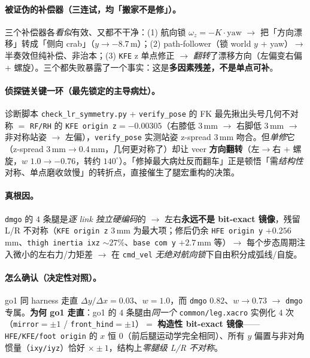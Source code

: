 \paragraph{被证伪的补偿器（三连试，均「搬家不是修」）。}
三个补偿器各\emph{看似}有效、又都不干净：(1) 航向锁 $\omega_z{=}-K\cdot\mathrm{yaw}$ $\to$ 把「方向漂移」转成「侧向 crab」（$y\to-8.7$\,m）；(2) path-follower（锁 world $y$ + yaw）$\to$ 半奏效但纯补偿、非治本；(3) \texttt{KFE} z 单点修正 $\to$ \emph{翻转}了漂移方向（左偏变右偏 + 螺旋）。三个都失败暴露了一个事实：这是\textbf{多因素残差，不是单点可补}。

\paragraph{侦探链关键一环（最先锁定的主导病灶）。}
诊断脚本 \texttt{check\_lr\_symmetry.\allowbreak py} + \texttt{verify\_pose} 的 FK 最先揪出头号几何不对称 $=$ \texttt{RF/RH} 的 \texttt{KFE origin z}$=-0.00305$（右膝低 $3$\,mm $\to$ 右脚低 $3$\,mm $\to$ 非对称站姿 $\to$ 左偏），\texttt{verify\_pose} 实测站姿 z-spread $3$\,mm 吻合。但\emph{单修}它（z-spread $3$\,mm$\to0.4$\,mm，几何更对称了）却让 veer \textbf{方向翻转}（左$\to$右 + 螺旋，$w$ $1.0\to-0.76$，转约 $140^\circ$）。「修掉最大病灶反而翻车」正是顿悟「需\emph{结构性}对称、单点磨收敛慢」的转折点，直接催生了腿宏重构的决策。

\paragraph{真根因。}
\texttt{dmgo} 的 $4$ 条腿是\emph{逐 link 独立硬编码}的 $\to$ 左右\textbf{永远不是 bit-exact 镜像}，残留 L/R 不对称（\texttt{KFE origin z} $3$\,mm 为最大项；修后仍余 \texttt{HFE origin y} $+0.256$\,mm、\texttt{thigh inertia ixz} $\sim27\%$、\texttt{base com y} $+2.7$\,mm 等）$\to$ 每个步态周期注入微小的左右力/力矩差 $\to$ 在 \texttt{cmd\_vel} \emph{无绝对航向锁}下自由积分成弧线/自旋。

\paragraph{怎么确认（决定性对照）。}
go1 同 harness 走直 $\Delta y/\Delta x{=}0.03$、$w{=}1.0$，而 \texttt{dmgo} $0.82$、$w\to0.73$ $\to$ \texttt{dmgo} 专属。\textbf{为何 go1 走直}：go1 的 $4$ 条腿由\emph{同一个} \texttt{common/\allowbreak leg.\allowbreak xacro} 实例化 $4$ 次（\texttt{mirror}$=\pm1$ / \texttt{front\_hind}$=\pm1$）$=$ \textbf{构造性 bit-exact 镜像}——\texttt{HFE/\allowbreak KFE/\allowbreak foot origin} 的 $x$ 恒 $0$（前后腿运动学完全相同）、所有 $y$ 偏置与非对角惯量（\texttt{ixy/iyz}）恰好 $\times\pm1$，结构上\emph{零腿级 L/R 不对称}。

